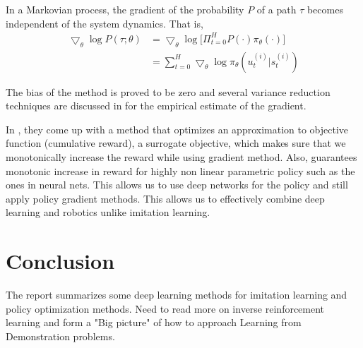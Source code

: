 \documentclass[11pt]{article}
\begin{document}
In a Markovian process, the gradient of the probability $P$ of a path $\tau$ becomes independent of the system dynamics. That is,
\begin{align*}
 \bigtriangledown_\theta \log{P(\tau;\theta)} &=  \bigtriangledown_\theta \log \Big[ \Pi_{t=0}^H P(\cdot)  \pi_{\theta}(\cdot) \Big]\\
 &= \sum_{t=0}^H \bigtriangledown_\theta \log{\pi_\theta(u_t^{(i)}|s_t^{(i)})}
\end{align*}

The bias of the method is proved to be zero and several variance reduction techniques are discussed in \cite{var} for the empirical estimate of the gradient.

In \cite{approx}, they come up with a method that optimizes an approximation to objective function (cumulative reward), a surrogate objective, which makes sure that we monotonically increase the reward while using gradient method. Also, \cite{trpo} guarantees monotonic increase in reward for highly non linear parametric policy such as the ones in neural nets. This allows us to use deep networks for the policy and still apply policy gradient methods. This allows us to effectively combine deep learning and robotics unlike imitation learning.

\section{Conclusion}
The report summarizes some deep learning methods for imitation learning and policy optimization methods. Need to read more on inverse reinforcement learning and form a "Big picture" of how to approach Learning from Demonstration problems.  
\end{document}
